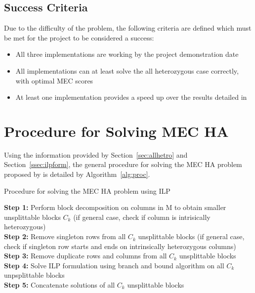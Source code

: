 \documentclass[10pt,twocolumn]{article}
\begin{document}
\subsection{Success Criteria}

Due to the difficulty of the problem, the following criteria are defined which must be met for the project to
be considered a success:
\begin{itemize}[noitemsep]
    \item{All three implementations are working by the project demonstration date}
    \item{All implementations can at least solve the all heterozygous case correctly, with optimal MEC scores}
    \item{At least one implementation provides a speed up over the results detailed in \cite{chen:2013} }
\end{itemize}


\section{Procedure for Solving MEC HA} \label{sec:proc}

Using the information provided by Section~\ref{sec:allhetro} and Section~\ref{ssec:ilpform}, the general
procedure for solving the MEC HA problem proposed by \cite{chen:2013} is detailed by Algorithm~\ref{alg:proc}.
\begin{algorithm}[h!]
    \small
    \caption{Procedure for solving the MEC HA problem using ILP}
    \label{alg:proc}
\textbf{Step 1:} Perform block decomposition on columns in M to obtain smaller unsplittable blocks $C_k$ (if 
general case, check if column is intrisically heterozygous)                                                       \\
\textbf{Step 2:} Remove singleton rows from all $C_k$ unsplittable blocks (if general case, check 
if singleton row starts and ends on intrinsically heterozygous columns)                                          \\
\textbf{Step 3:} Remove duplicate rows and columns from all $C_k$ unsplittable blocks 							        \\
\textbf{Step 4:} Solve ILP formulation using branch and bound algorithm on all $C_k$ unpsplittable blocks           \\
\textbf{Step 5:} Concatenate solutions of all $C_k$ unsplittable blocks
\end{algorithm}
\end{document}
